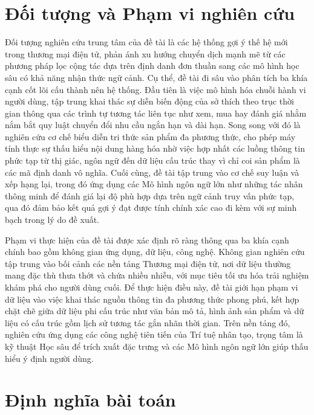 \section{Đối tượng và Phạm vi nghiên cứu}

Đối tượng nghiên cứu trung tâm của đề tài là các hệ thống gợi ý thế hệ mới trong thương mại điện tử, phản ánh xu hướng chuyển dịch mạnh mẽ từ các phương pháp lọc cộng tác dựa trên định danh đơn thuần sang các mô hình học sâu có khả năng nhận thức ngữ cảnh. Cụ thể, đề tài đi sâu vào phân tích ba khía cạnh cốt lõi cấu thành nên hệ thống. Đầu tiên là việc mô hình hóa chuỗi hành vi người dùng, tập trung khai thác sự diễn biến động của sở thích theo trục thời gian thông qua các trình tự tương tác liên tục như xem, mua hay đánh giá nhằm nắm bắt quy luật chuyển đổi nhu cầu ngắn hạn và dài hạn. Song song với đó là nghiên cứu cơ chế biểu diễn tri thức sản phẩm đa phương thức, cho phép máy tính thực sự thấu hiểu nội dung hàng hóa nhờ việc hợp nhất các luồng thông tin phức tạp từ thị giác, ngôn ngữ đến dữ liệu cấu trúc thay vì chỉ coi sản phẩm là các mã định danh vô nghĩa. Cuối cùng, đề tài tập trung vào cơ chế suy luận và xếp hạng lại, trong đó ứng dụng các Mô hình ngôn ngữ lớn như những tác nhân thông minh để đánh giá lại độ phù hợp dựa trên ngữ cảnh truy vấn phức tạp, qua đó đảm bảo kết quả gợi ý đạt được tính chính xác cao đi kèm với sự minh bạch trong lý do đề xuất.

Phạm vi thực hiện của đề tài được xác định rõ ràng thông qua ba khía cạnh chính bao gồm không gian ứng dụng, dữ liệu, công nghệ. Không gian nghiên cứu tập trung vào bối cảnh các nền tảng Thương mại điện tử, nơi dữ liệu thường mang đặc thù thưa thớt và chứa nhiều nhiễu, với mục tiêu tối ưu hóa trải nghiệm khám phá cho người dùng cuối. Để thực hiện điều này, đề tài giới hạn phạm vi dữ liệu vào việc khai thác nguồn thông tin đa phương thức phong phú, kết hợp chặt chẽ giữa dữ liệu phi cấu trúc như văn bản mô tả, hình ảnh sản phẩm và dữ liệu có cấu trúc gồm lịch sử tương tác gắn nhãn thời gian. Trên nền tảng đó, nghiên cứu ứng dụng các công nghệ tiên tiến của Trí tuệ nhân tạo, trọng tâm là kỹ thuật Học sâu để trích xuất đặc trưng và các Mô hình ngôn ngữ lớn giúp thấu hiểu ý định người dùng.

\section{Định nghĩa bài toán}

